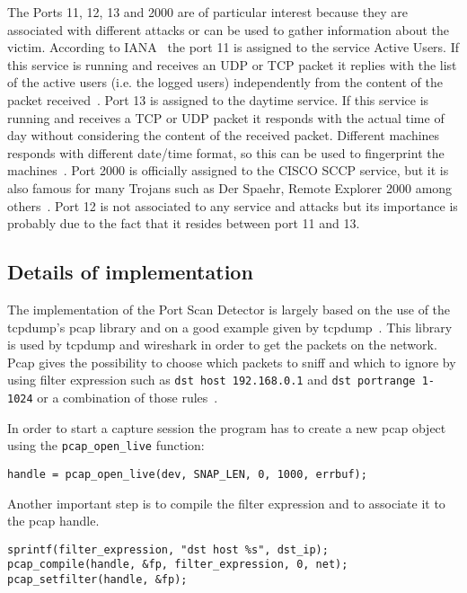 The Ports 11, 12, 13 and 2000 are of particular interest because they are associated with different attacks or can be used
to gather information about the victim.
According to IANA~\cite{IANAPORTS} the port 11 is assigned to the service Active Users. If this service is running and
receives an UDP or TCP packet it replies with the list of the active users (i.e. the logged users) independently from the
content of the packet received~\cite{systat}.
Port 13 is assigned to the daytime service. If this service is running and receives a TCP or UDP packet it responds with the actual time of day without considering
the content of the received packet. Different machines responds with different date/time format, so this can be used to fingerprint the machines~\cite{portDetails}.
Port 2000 is officially assigned to the CISCO SCCP service, but it is also famous for 
many Trojans such as Der Spaehr, Remote Explorer 2000 among others~\cite{portDetails}.
Port 12 is not associated to any service and attacks but its importance is probably due to the fact that it resides between port 11 and 13.




\subsection{Details of implementation}
The implementation of the Port Scan Detector is largely based on the use of the tcpdump's pcap library
and on a good example given by tcpdump~\cite{pcaptcpdump}.
This library is used by tcpdump and wireshark in order to get  the packets on the network.
Pcap gives the possibility to choose which packets to sniff and which to ignore by using filter expression 
such as \lstinline!dst host 192.168.0.1! and \lstinline!dst portrange 1-1024! or a combination of those rules~\cite{pcapFilterRules}.



In order to start a capture session the program has to create a new pcap object using the \lstinline!pcap_open_live! function:
\begin{lstlisting}[style=MyC, caption={Create a new pcap handler.}, label=lst:open_live]
handle = pcap_open_live(dev, SNAP_LEN, 0, 1000, errbuf);
\end{lstlisting}
Another important step is to compile the filter expression and to associate it to the pcap handle.
\begin{lstlisting}[style=MyC, caption=Pcap functions called to compile the filter expression and to set it.]
sprintf(filter_expression, "dst host %s", dst_ip);
pcap_compile(handle, &fp, filter_expression, 0, net);
pcap_setfilter(handle, &fp);
\end{lstlisting}




